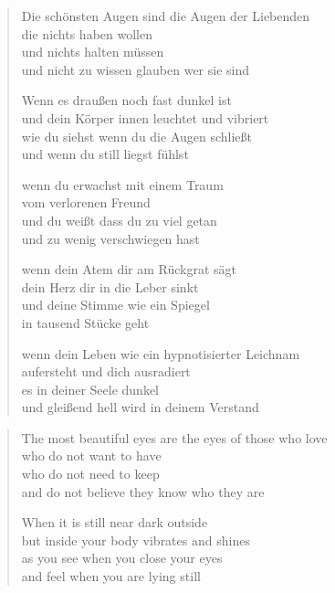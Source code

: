 
{\addtolength{\vleftmargin}{-1em}

\cleartoverso


\begin{verse}

Die schönsten Augen sind die Augen der Liebenden\\
die nichts haben wollen\\
und nichts halten müssen\\
und nicht zu wissen glauben wer sie sind

Wenn es draußen noch fast dunkel ist\\
und dein Körper innen leuchtet und vibriert\\
wie du siehst wenn du die Augen schließt\\
und wenn du still liegst fühlst

wenn du erwachst mit einem Traum\\
vom verlorenen Freund\\
und du weißt dass du zu viel getan\\
und zu wenig verschwiegen hast

wenn dein Atem dir am Rückgrat sägt\\
dein Herz dir in die Leber sinkt\\
und deine Stimme wie ein Spiegel\\
in tausend Stücke geht

wenn dein Leben wie ein hypnotisierter Leichnam\\
aufersteht und dich ausradiert\\
es in deiner Seele dunkel\\
und gleißend hell wird in deinem Verstand
\end{verse}

\clearpage


\begin{verse}

The most beautiful eyes are the eyes of those who love\\
who do not want to have\\
who do not need to keep\\
and do not believe they know who they are

When it is still near dark outside\\
but inside your body vibrates and shines\\
as you see when you close your eyes\\
and feel when you are lying still


\end{verse}}
